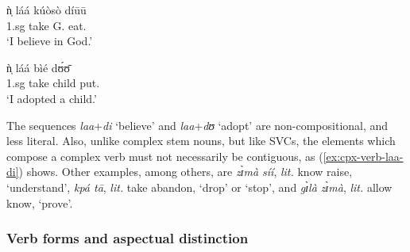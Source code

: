 \begin{exe}
\begin{exe}
\begin{exe}
{\begin{exe}
\begin{exe}
\begin{exe}
\begin{exe}
\begin{exe}
\begin{exe}
\begin{exe}
\begin{xlist}
\begin{exe}
\begin{exe}
\begin{exe}
\begin{exe}
\begin{exe}
\begin{exe}
\begin{exe}
\begin{exe}
\begin{exe}
\begin{exe}
\begin{exe}
\begin{exe}
\begin{exe}
\ea\label{ex:cpx-verb-laa-di}
\ea
 \gll ǹ̩ láá kúòsò díūū \\
{\sc 1.sg} take G.  eat.{\foc}  \\
\glt `I believe in God.'

\ex
 \gll  ǹ̩ láá bìé dʊ́ʊ̄ \\
{\sc 1.sg} take child put.{\foc}  \\
\glt `I adopted a child.'
\z 
 \z
 
 The sequences  {\it laa}+{\it di} `believe'  and {\it laa}+{\it dʊ} `adopt'  
are  non-compositional, and less literal. Also, unlike complex stem nouns, but 
like SVCs, the elements which compose a complex verb must not necessarily be 
contiguous,  as  (\ref{ex:cpx-verb-laa-di}) shows. Other examples, among others, 
 are {\it zɪ̀mà síí}, {\it lit.} know raise, `understand',  {\it kpá tā}, 
{\it lit.}  take abandon, `drop' or `stop', and {\it gɪ̀là zɪ̀mà}, {\it lit.} 
allow know, `prove'.



\subsubsection{Verb forms and aspectual distinction}
\label{sec:GRM-verb-word}


\end{exe}
\end{exe}
\end{exe}
\end{exe}
\end{exe}
\end{exe}
\end{exe}
\end{exe}
\end{exe}
\end{exe}
\end{exe}
\end{exe}
\end{exe}
\end{xlist}
\end{exe}
\end{exe}
\end{exe}
\end{exe}
\end{exe}
\end{exe}
\end{exe}}
\end{exe}
\end{exe}
\end{exe}
